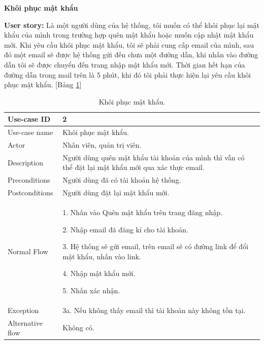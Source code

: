 \textbf{Khôi phục mật khẩu}\par
\textbf{User story:} Là một người dùng của hệ thống, tôi muốn có thể khôi phục lại mật khẩu của mình trong trường hợp quên mật khẩu hoặc muốn cập nhật mật khẩu mới. Khi yêu cầu khôi phục mật khẩu, tôi sẽ phải cung cấp email của mình, sau đó một email sẽ được hệ thống gửi đến chưa một đường dẫn, khi nhấn vào đường dẫn tôi sẽ được chuyển đến trang nhập mật khẩu mới. Thời gian hết hạn của đường dẫn trong mail trên là 5 phút, khi đó tôi phải thực hiện lại yêu cầu khôi phục mật khẩu. [Bảng \ref{bang2}]
\begin{table}[H]
    \centering
    \begin{tabular}{|m{3cm}|m{10cm}|}
    \hline 
        Use-case ID & 2\\ \hline
        Use-case name & Khôi phục mật khẩu.\\ \hline
        Actor & Nhân viên, quản trị viên.\\ \hline
        Description & Người dùng quên mật khẩu tài khoản của mình thì vẫn có thể đặt lại mật khẩu mới qua xác thực email.\\ \hline
        Preconditions & Người dùng đã có tài khoản hệ thống.\\ \hline
        Postconditions & Người dùng đặt lại mật khẩu mới.\\ \hline
        Normal Flow & 
        1. Nhấn vào Quên mật khẩu trên trang đăng nhập.\par
        2. Nhập email đã đăng kí cho tài khoản.\par
        3. Hệ thống sẽ gửi email, trên email sẽ có đường link để đổi mật khẩu, nhấn vào link.\par
        4. Nhập mật khẩu mới.\par
        5. Nhấn xác nhận.
        \\ \hline
        Exception & 3a. Nếu không thấy email thì tài khoản này không tồn tại.\\ \hline
        Alternative flow & Không có.\\ 
    \hline 
    \end{tabular}
    \caption{Khôi phục mật khẩu.}
    \label{bang2}
\end{table}


